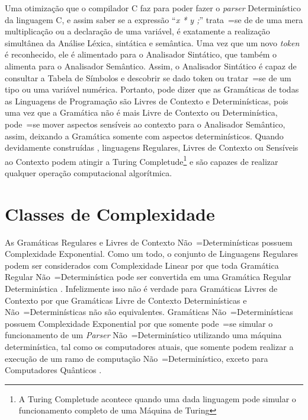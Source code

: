 {    Uma otimização que o compilador C faz para poder fazer
    o \textit{parser} Determinístico da linguagem C,
    e assim saber se a expressão ``\textit{x * y ;}'' trata~=se de
    de uma mera multiplicação ou a declaração de uma variável,
    é exatamente a realização simultânea da Análise Léxica,
    sintática e
    semântica.
    Uma vez que um novo \textit{token} é reconhecido,
    ele é alimentado para o Analisador Sintático,
    que também o alimenta para o Analisador Semântico.
    Assim,
    o Analisador Sintático é capaz de consultar a Tabela de Símbolos\cite{ahoCompilerDragonBook} e
    descobrir se dado token ou tratar~=se de um tipo ou uma variável numérica.
    Portanto,
    pode dizer que as Gramáticas de todas as Linguagens de Programação são Livres de Contexto e
    Determinísticas,
    pois uma vez que a Gramática não é mais Livre de Contexto ou Determinística,
    pode~=se mover aspectos sensíveis ao contexto para o Analisador Semântico,
    assim,
    deixando a Gramática somente com aspectos determinísticos.
    Quando devidamente construídas \cite{turingCompleteRegularLanguages},
    linguagens Regulares,
    Livres de Contexto ou Sensíveis ao Contexto podem atingir a Turing Completude\footnote{A Turing
    Completude acontece quando uma dada linguagem pode simular o funcionamento completo de uma
    Máquina de Turing} \cite{areThereDomainSpecificLanguages,contextSensitiveParsing} e
    são capazes de realizar qualquer operação computacional algorítmica.


\section{Classes de Complexidade}

    As Gramáticas Regulares e
    Livres de Contexto Não~=Determinísticas possuem Complexidade Exponential.
    Como um todo,
    o conjunto de Linguagens Regulares podem ser considerados com Complexidade
    Linear por que toda Gramática Regular Não~=Determinística pode ser
    convertida em uma Gramática Regular Determinística \cite{sipserBook}.
    Infelizmente isso não é verdade para Gramáticas Livres de Contexto
    por que Gramáticas Livre de Contexto Determinísticas e
    Não~=Determinísticas não são equivalentes.
    Gramáticas Não~=Determinísticas possuem Complexidade Exponential por que
    somente pode~=se simular o funcionamento de um \textit{Parser}
    Não~=Determinístico utilizando uma máquina determinística,
    tal como os computadores atuais,
    que somente podem realizar a execução de um ramo de computação Não~=Determinístico,
    exceto para Computadores Quânticos \cite{nonlinearQuantumComputers}.

}
